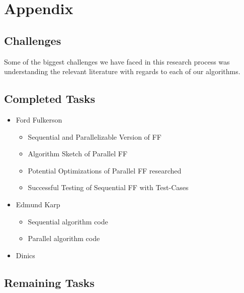 \section{Appendix}

\subsection{Challenges}
    Some of the biggest challenges we have faced in this research process was understanding the relevant literature with regards to each of our algorithms.

\subsection{Completed Tasks}
    \begin{itemize}
        \item Ford Fulkerson
            \begin{itemize}
                \item Sequential and Parallelizable Version of FF
                \item Algorithm Sketch of Parallel FF
                \item Potential Optimizations of Parallel FF researched
                \item Successful Testing of Sequential FF with Test-Cases
            \end{itemize}
        \item Edmund Karp
            \begin{itemize}
                \item Sequential algorithm code
                \item Parallel algorithm code
            \end{itemize}
        \item Dinics
    \end{itemize}
\subsection{Remaining Tasks}